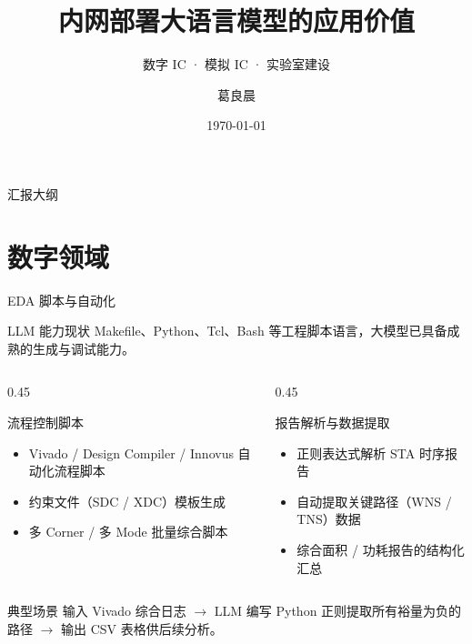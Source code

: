 \documentclass[aspectratio=169, 10pt, UTF8]{ctexbeamer}
\title[内网部署LLM的应用价值]{内网部署大语言模型的应用价值}
\subtitle{数字 IC · 模拟 IC · 实验室建设}
\author[葛良晨]{葛良晨}
\institute[组会汇报]{组会汇报}
\date{\today}
\begin{document}
\begin{frame}
  \titlepage
\end{frame}

\begin{frame}{汇报大纲}
  \tableofcontents
\end{frame}

\section{数字领域}

\begin{frame}{EDA 脚本与自动化}
  \begin{exampleblock}{LLM 能力现状}
    Makefile、Python、Tcl、Bash 等工程脚本语言，大模型已具备成熟的生成与调试能力。
  \end{exampleblock}

  \vspace{6pt}
  \begin{columns}[T]
    \begin{column}{0.45\textwidth}
      \begin{block}{流程控制脚本}
        \begin{itemize}
          \item Vivado / Design Compiler / Innovus 自动化流程脚本
          \item 约束文件（SDC / XDC）模板生成
          \item 多 Corner / 多 Mode 批量综合脚本
        \end{itemize}
      \end{block}
    \end{column}
    \begin{column}{0.45\textwidth}
      \begin{block}{报告解析与数据提取}
        \begin{itemize}
          \item 正则表达式解析 STA 时序报告
          \item 自动提取关键路径（WNS / TNS）数据
          \item 综合面积 / 功耗报告的结构化汇总
        \end{itemize}
      \end{block}
    \end{column}
  \end{columns}

  \vspace{8pt}
  \begin{alertblock}{典型场景}
    输入 Vivado 综合日志 $\rightarrow$ LLM 编写 Python 正则提取所有裕量为负的路径 $\rightarrow$ 输出 CSV 表格供后续分析。
  \end{alertblock}
\end{frame}
\end{document}
